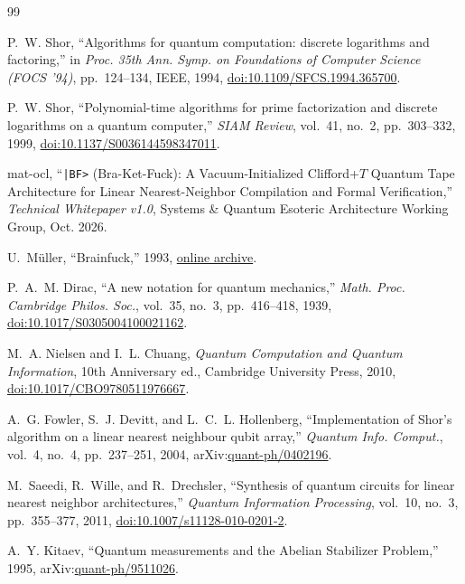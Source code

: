 \documentclass[11pt,a4paper,twocolumn]{article}
\begin{document}
\begin{thebibliography}{99}

P.~W. Shor, ``Algorithms for quantum computation: discrete logarithms and factoring,'' in \emph{Proc. 35th Ann. Symp. on Foundations of Computer Science (FOCS '94)}, pp.~124--134, IEEE, 1994, \href{https://doi.org/10.1109/SFCS.1994.365700}{doi:10.1109/SFCS.1994.365700}.

P.~W. Shor, ``Polynomial-time algorithms for prime factorization and discrete logarithms on a quantum computer,'' \emph{SIAM Review}, vol.~41, no.~2, pp.~303--332, 1999, \href{https://doi.org/10.1137/S0036144598347011}{doi:10.1137/S0036144598347011}.

mat-ocl, ``\texttt{|BF>} (Bra-Ket-Fuck): A Vacuum-Initialized Clifford+$T$ Quantum Tape Architecture for Linear Nearest-Neighbor Compilation and Formal Verification,'' \emph{Technical Whitepaper v1.0}, Systems \& Quantum Esoteric Architecture Working Group, Oct. 2026.

U.~M{\"u}ller, ``Brainfuck,'' 1993, \href{https://en.wikipedia.org/wiki/Brainfuck}{online archive}.

P.~A.~M. Dirac, ``A new notation for quantum mechanics,'' \emph{Math. Proc. Cambridge Philos. Soc.}, vol.~35, no.~3, pp.~416--418, 1939, \href{https://doi.org/10.1017/S0305004100021162}{doi:10.1017/S0305004100021162}.

M.~A. Nielsen and I.~L. Chuang, \emph{Quantum Computation and Quantum Information}, 10th Anniversary ed., Cambridge University Press, 2010, \href{https://doi.org/10.1017/CBO9780511976667}{doi:10.1017/CBO9780511976667}.

A.~G. Fowler, S.~J. Devitt, and L.~C.~L. Hollenberg, ``Implementation of Shor's algorithm on a linear nearest neighbour qubit array,'' \emph{Quantum Info. Comput.}, vol.~4, no.~4, pp.~237--251, 2004, arXiv:\href{https://arxiv.org/abs/quant-ph/0402196}{quant-ph/0402196}.

M.~Saeedi, R.~Wille, and R.~Drechsler, ``Synthesis of quantum circuits for linear nearest neighbor architectures,'' \emph{Quantum Information Processing}, vol.~10, no.~3, pp.~355--377, 2011, \href{https://doi.org/10.1007/s11128-010-0201-2}{doi:10.1007/s11128-010-0201-2}.

A.~Y. Kitaev, ``Quantum measurements and the Abelian Stabilizer Problem,'' 1995, arXiv:\href{https://arxiv.org/abs/quant-ph/9511026}{quant-ph/9511026}.


\end{thebibliography}
\end{document}
